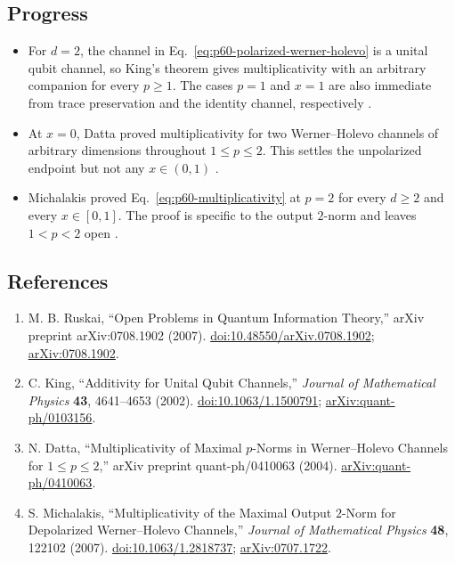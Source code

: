 \subsection*{Progress}

\begin{itemize}
  \item For $d=2$, the channel in
  Eq.~\eqref{eq:p60-polarized-werner-holevo} is a unital qubit channel, so
  King's theorem gives multiplicativity with an arbitrary companion for every
  $p\geq1$.  The cases $p=1$ and $x=1$ are also immediate from trace
  preservation and the identity channel, respectively
  .

  \item At $x=0$, Datta proved multiplicativity for two Werner--Holevo
  channels of arbitrary dimensions throughout $1\leq p\leq2$.  This settles
  the unpolarized endpoint but not any $x\in(0,1)$
  .

  \item Michalakis proved Eq.~\eqref{eq:p60-multiplicativity} at $p=2$ for
  every $d\geq2$ and every $x\in[0,1]$.  The proof is specific to the output
  $2$-norm and leaves $1<p<2$ open
  .
\end{itemize}

\subsection*{References}

\begin{enumerate}[label={},leftmargin=4.8em,labelsep=0.5em]
  \footnotesize
  \item[\textup{[Rus07]}]\label{ref:p60-ruskai}
  M. B. Ruskai, ``Open Problems in Quantum Information Theory,''
  arXiv preprint arXiv:0708.1902 (2007).
  \newline
  \href{https://doi.org/10.48550/arXiv.0708.1902}{doi:10.48550/arXiv.0708.1902};
  \href{https://arxiv.org/abs/0708.1902}{arXiv:0708.1902}.

  \item[\textup{[Kin02]}]\label{ref:p60-king}
  C. King, ``Additivity for Unital Qubit Channels,''
  \emph{Journal of Mathematical Physics} \textbf{43}, 4641--4653 (2002).
  \href{https://doi.org/10.1063/1.1500791}{doi:10.1063/1.1500791};
  \href{https://arxiv.org/abs/quant-ph/0103156}{arXiv:quant-ph/0103156}.

  \item[\textup{[Dat04]}]\label{ref:p60-datta}
  N. Datta, ``Multiplicativity of Maximal $p$-Norms in Werner--Holevo
  Channels for $1\leq p\leq2$,'' arXiv preprint quant-ph/0410063 (2004).
  \href{https://arxiv.org/abs/quant-ph/0410063}{arXiv:quant-ph/0410063}.

  \item[\textup{[Mic07]}]\label{ref:p60-michalakis}
  S. Michalakis, ``Multiplicativity of the Maximal Output $2$-Norm for
  Depolarized Werner--Holevo Channels,''
  \emph{Journal of Mathematical Physics} \textbf{48}, 122102 (2007).
  \href{https://doi.org/10.1063/1.2818737}{doi:10.1063/1.2818737};
  \href{https://arxiv.org/abs/0707.1722}{arXiv:0707.1722}.
\end{enumerate}

